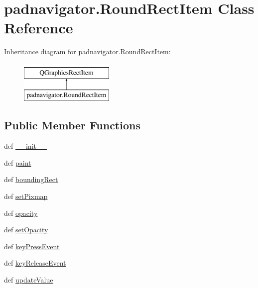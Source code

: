 \hypertarget{classpadnavigator_1_1RoundRectItem}{}\section{padnavigator.\+Round\+Rect\+Item Class Reference}
\label{classpadnavigator_1_1RoundRectItem}
Inheritance diagram for padnavigator.\+Round\+Rect\+Item\+:\begin{figure}[H]
\begin{center}
\leavevmode
\includegraphics[height=2.000000cm]{classpadnavigator_1_1RoundRectItem}
\end{center}
\end{figure}
\subsection*{Public Member Functions}
\begin{DoxyCompactItemize}
\item 
def \hyperlink{classpadnavigator_1_1RoundRectItem_ab7f18a3c20b5c303013b93736a1e3358}{\+\_\+\+\_\+init\+\_\+\+\_\+}
\item 
def \hyperlink{classpadnavigator_1_1RoundRectItem_a6fef82e9e1de3f1b27488302b523fcbf}{paint}
\item 
def \hyperlink{classpadnavigator_1_1RoundRectItem_ad735bfa69efe24569e9ebb7a1c5a28e9}{bounding\+Rect}
\item 
def \hyperlink{classpadnavigator_1_1RoundRectItem_a4d5b3cf33bf4f0fed9c5970c3753f53e}{set\+Pixmap}
\item 
def \hyperlink{classpadnavigator_1_1RoundRectItem_a0daf602e3cccc2839134219f8500f1a7}{opacity}
\item 
def \hyperlink{classpadnavigator_1_1RoundRectItem_a001838baf3006d166b147defc744f866}{set\+Opacity}
\item 
def \hyperlink{classpadnavigator_1_1RoundRectItem_a2e49f95a6aeb8c65c26e873004bfff6b}{key\+Press\+Event}
\item 
def \hyperlink{classpadnavigator_1_1RoundRectItem_a986bc070891e953d7167dbabdb4bb896}{key\+Release\+Event}
\item 
def \hyperlink{classpadnavigator_1_1RoundRectItem_a102e9d460393d387af3ad4766fffd030}{update\+Value}
\end{DoxyCompactItemize}
